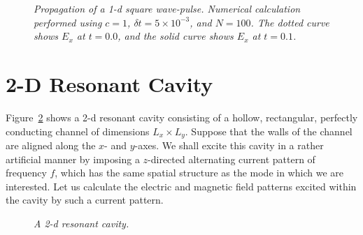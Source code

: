\begin{figure}
\epsfysize=3in
\centerline{}
\caption{\em Propagation of a 1-d square wave-pulse.
Numerical  calculation performed using
$c=1$, $\delta t = 5\times 10^{-3}$, and $N=100$.
The dotted curve shows $E_x$ at $t=0.0$, and  the solid curve shows $E_x$ at $t=0.1$.}\label{fwave1db}
\end{figure}

\section{2-D Resonant Cavity}
Figure~\ref{frescav} shows a 2-d resonant cavity consisting of a hollow, rectangular, perfectly
conducting channel of dimensions $L_x\times L_y$. Suppose that the walls
of the channel are aligned along the $x$- and $y$-axes.
We shall excite this cavity in a rather artificial manner
by imposing a $z$-directed alternating current pattern of frequency $f$,
which has the same spatial structure as the mode in which we are interested. Let us calculate the electric
and magnetic field patterns excited within the cavity by such a current pattern.

\begin{figure}
\epsfysize=3in
\centerline{}
\caption{\em A 2-d resonant cavity.}\label{frescav}
\end{figure}

